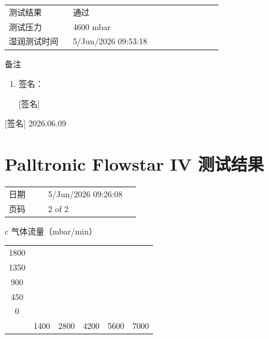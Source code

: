 \documentclass[UTF8,10pt,a4paper,fontset=fandol]{ctexart}
\newcommand{\fieldvalue}[1]{#1}
\newcommand{\handwritten}[1]{#1}
\begin{document}
\begin{tabular}{@{}p{0.27\linewidth}p{0.63\linewidth}@{}}
测试结果 &
\fieldvalue{通过}
\\
测试压力 &
\fieldvalue{4600 mbar}
\\
湿润测试时间 &
\fieldvalue{5/Jun/2026 09:53:18}
\end{tabular}

\medskip
备注

\begin{enumerate}
\item 签名：

\fieldvalue{\handwritten{[签名]}}
\end{enumerate}

\handwritten{[签名] 2026.06.09}

\section*{Palltronic Flowstar IV 测试结果}

\begin{tabular}{@{}p{0.27\linewidth}p{0.63\linewidth}@{}}
日期 &
\fieldvalue{5/Jun/2026 09:26:08}
\\
页码 &
\fieldvalue{2 of 2}
\end{tabular}

\medskip

\begin{center}
\begin{tabular}{c}
气体流量（mbar/min）\\[-2pt]
\begin{tabular}{c|ccccc}
1800 & & & & & \\
1350 & & & & & \\
900  & & & & & \\
450  & & & & & \\
0    & & & & & \\
\hline
& 1400 & 2800 & 4200 & 5600 & 7000
\end{tabular}\\[-2pt]
\end{tabular}
\end{center}
\end{document}
